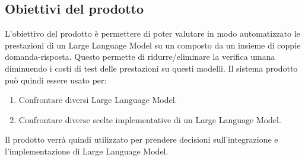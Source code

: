 \subsection{Obiettivi del prodotto}
L'obiettivo del prodotto è permettere di poter valutare in modo automatizzato le prestazioni di un Large Language Model su un  composto da un insieme di coppie domanda-risposta.
Questo permette di ridurre/eliminare la verifica umana diminuendo i costi di test delle prestazioni su questi modelli.
Il sistema prodotto può quindi essere usato per:
\begin{enumerate}
    \item Confrontare diversi Large Language Model.
    \item Confrontare diverse scelte implementative di un Large Language Model.
\end{enumerate} 
Il prodotto verrà quindi utilizzato per prendere decisioni sull'integrazione e l'implementazione di Large Language Model.
